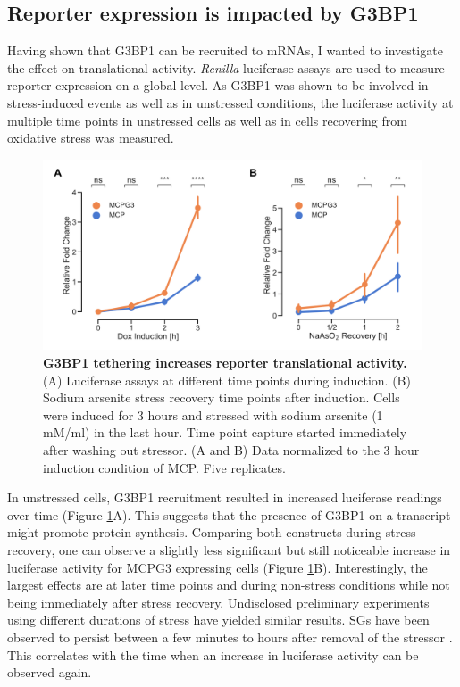 \subsection{Reporter expression is impacted by G3BP1} \label{mcp_luciferase}

Having shown that G3BP1 can be recruited to mRNAs, I wanted to investigate the effect on translational activity. \textit{Renilla} luciferase assays are used to measure reporter expression on a global level.
As G3BP1 was shown to be involved in stress-induced events as well as in unstressed conditions, the luciferase activity at multiple time points in unstressed cells as well as in cells recovering from oxidative stress was measured.

\begin{figure}[t!]
    \centering
    \includegraphics[width=\linewidth]{images/figure3}
    \caption{\textbf{G3BP1 tethering increases reporter translational activity.}
        (A) Luciferase assays at different time points during induction.
        (B) Sodium arsenite stress recovery time points after induction.
            Cells were induced for 3 hours and stressed with sodium arsenite (1 mM/ml) in the last hour.
            Time point capture started immediately after washing out stressor.
        (A and B) Data normalized to the 3 hour induction condition of MCP. Five replicates.   
    }
    \label{fig:mcp_luciferase}
\end{figure}

In unstressed cells, G3BP1 recruitment resulted in increased luciferase readings over time (Figure \ref{fig:mcp_luciferase}A).
This suggests that the presence of G3BP1 on a transcript might promote protein synthesis.
Comparing both constructs during stress recovery, one can observe a slightly less significant but still noticeable increase in luciferase activity for MCPG3 expressing cells (Figure \ref{fig:mcp_luciferase}B).
Interestingly, the largest effects are at later time points and during non-stress conditions while not being immediately after stress recovery.
Undisclosed preliminary experiments using different durations of stress have yielded similar results.
SGs have been observed to persist between a few minutes to hours after removal of the stressor \cite{chen_relationships_2017}.
This correlates with the time when an increase in luciferase activity can be observed again.


